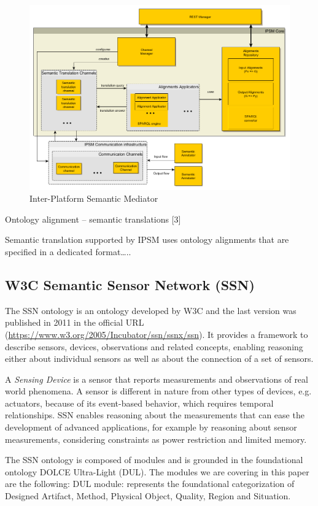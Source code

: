 \documentclass{sig-alternate-05-2015}
\begin{document}
\begin{figure}[h!]
\centering
\includegraphics[scale=0.22]{IPSM}
\caption{Inter-Platform Semantic Mediator}
\label{fig:IPSM}
\end{figure}

Ontology alignment – semantic translations [3]

Semantic translation supported by IPSM uses ontology alignments that are specified in a dedicated format….. 


\subsection{W3C Semantic Sensor Network (SSN)}
The SSN ontology \cite{Compton2012} is an ontology developed by W3C and the last version was published in 2011 in the official URL (\url{https://www.w3.org/2005/Incubator/ssn/ssnx/ssn}). It provides a framework to describe sensors, devices, observations and related concepts, enabling reasoning either about individual sensors as well as about the connection of a set of sensors. 

A \textit{Sensing Device} is a sensor that reports measurements and observations of real world phenomena. A sensor is different in nature from other types of devices, e.g. actuators, because of its event-based behavior, which requires temporal relationships. SSN enables reasoning about the measurements that can ease the development of advanced applications, for example by reasoning about sensor measurements, considering constraints as power restriction and limited memory. 

The SSN ontology is composed of modules and is grounded in the foundational ontology DOLCE Ultra-Light (DUL). The modules we are covering in this paper are the following:
DUL module: represents the foundational categorization of Designed Artifact, Method, Physical Object, Quality, Region and Situation.  
\end{document}

